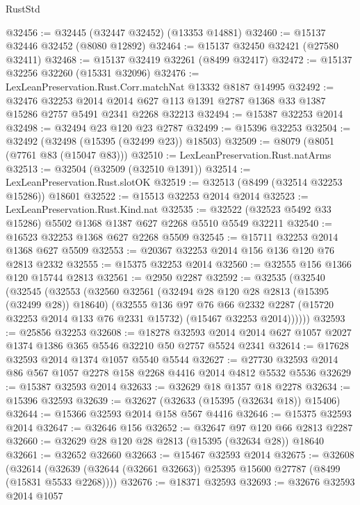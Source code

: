 \begin{lexlean}{RustStd}
\begin{coremodule}
@32456 := @32445 (@32447 @32452) (@13353 @14881)
@32460 := @15137 @32446 @32452 (@8080 @12892)
@32464 := @15137 @32450 @32421 (@27580 @32411)
@32468 := @15137 @32419 @32261 (@8499 @32417)
@32472 := @15137 @32256 @32260 (@15331 @32096)
@32476 := LexLeanPreservation.Rust.Corr.matchNat @13332 @8187 @14995
@32492 := @32476
    @32253
    @2014
    @2014
    @627
    @113
    @1391
    @2787
    @1368
    @33
    @1387
    @15286
    @2757
    @5491
    @2341
    @2268
    @32213
@32494 := @15387 @32253 @2014
@32498 := @32494 @23 @120 @23 @2787
@32499 := @15396 @32253
@32504 := @32492 (@32498 (@15395 (@32499 @23)) @18503)
@32509 := @8079 (@8051 (@7761 @83 (@15047 @83)))
@32510 := LexLeanPreservation.Rust.natArms
@32513 := @32504 (@32509 (@32510 @1391))
@32514 := LexLeanPreservation.Rust.slotOK
@32519 := @32513 (@8499 (@32514 @32253 @15286)) @18601
@32522 := @15513 @32253 @2014 @2014
@32523 := LexLeanPreservation.Rust.Kind.nat
@32535 := @32522 (@32523 @5492 @33 @15286) @5502 @1368 @1387 @627 @2268 @5510 @5549 @32211
@32540 := @16523 @32253 @1368 @627 @2268 @5509
@32545 := @15711 @32253 @2014 @1368 @627 @5509
@32553 := @20367 @32253 @2014 @156 @136 @120 @76 @2813 @2332
@32555 := @15375 @32253 @2014
@32560 := @32555 @156 @1366 @120 @15744 @2813
@32561 := @2950 @2287
@32592 := @32535
    (@32540
      (@32545
        (@32553
          (@32560
            @32561
            (@32494 @28 @120 @28 @2813 (@15395 (@32499 @28)) @18640)
            (@32555
              @136
              @97
              @76
              @66
              @2332
              @2287
              (@15720 @32253 @2014 @133 @76 @2331 @15732)
              (@15467 @32253 @2014))))))
@32593 := @25856 @32253
@32608 := @18278
    @32593
    @2014
    @2014
    @627
    @1057
    @2027
    @1374
    @1386
    @365
    @5546
    @32210
    @50
    @2757
    @5524
    @2341
@32614 := @17628 @32593 @2014 @1374 @1057 @5540 @5544
@32627 := @27730 @32593 @2014 @86 @567 @1057 @2278 @158 @2268 @4416 @2014 @4812 @5532 @5536
@32629 := @15387 @32593 @2014
@32633 := @32629 @18 @1357 @18 @2278
@32634 := @15396 @32593
@32639 := @32627 (@32633 (@15395 (@32634 @18)) @15406)
@32644 := @15366 @32593 @2014 @158 @567 @4416
@32646 := @15375 @32593 @2014
@32647 := @32646 @156
@32652 := @32647 @97 @120 @66 @2813 @2287
@32660 := @32629 @28 @120 @28 @2813 (@15395 (@32634 @28)) @18640
@32661 := @32652 @32660
@32663 := @15467 @32593 @2014
@32675 := @32608
    (@32614 (@32639 (@32644 (@32661 @32663)) @25395 @15600 @27787 (@8499 (@15831 @5533 @2268))))
@32676 := @18371 @32593
@32693 := @32676
    @32593
    @2014
    @1057

\end{coremodule}
\end{lexlean}
